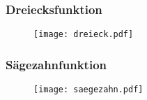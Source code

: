 
\subsubsection{Dreiecksfunktion}
\begin{figure}
    \centering
    \caption{}
    \texttt{[image: dreieck.pdf]}
\end{figure}

\subsubsection{Sägezahnfunktion}
\begin{figure}
    \centering
    \caption{}
    \texttt{[image: saegezahn.pdf]}
\end{figure}


